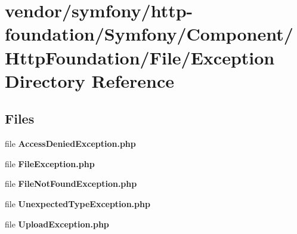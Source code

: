 \section{vendor/symfony/http-\/foundation/\+Symfony/\+Component/\+Http\+Foundation/\+File/\+Exception Directory Reference}
\label{dir_e1f199379873bf353f35790bf17515db}
\subsection*{Files}
\begin{DoxyCompactItemize}
\item 
file {\bf Access\+Denied\+Exception.\+php}
\item 
file {\bf File\+Exception.\+php}
\item 
file {\bf File\+Not\+Found\+Exception.\+php}
\item 
file {\bf Unexpected\+Type\+Exception.\+php}
\item 
file {\bf Upload\+Exception.\+php}
\end{DoxyCompactItemize}
